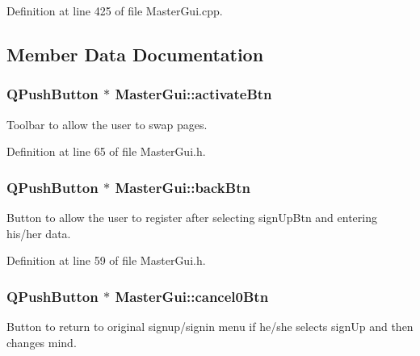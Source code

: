 Definition at line 425 of file Master\-Gui.\-cpp.



\subsection{Member Data Documentation}
\hypertarget{class_master_gui_a0916c489aa00b9e79a617ada5f2339b9}{
\subsubsection[{activate\-Btn}]{\setlength{\rightskip}{0pt plus 5cm}Q\-Push\-Button $\ast$ Master\-Gui\-::activate\-Btn\hspace{0.3cm}{\ttfamily [private]}}}\label{class_master_gui_a0916c489aa00b9e79a617ada5f2339b9}
Toolbar to allow the user to swap pages. 

Definition at line 65 of file Master\-Gui.\-h.

\hypertarget{class_master_gui_a4a80f25f8b78be209097d40c0d0f012b}{
\subsubsection[{back\-Btn}]{\setlength{\rightskip}{0pt plus 5cm}Q\-Push\-Button $\ast$ Master\-Gui\-::back\-Btn\hspace{0.3cm}{\ttfamily [private]}}}\label{class_master_gui_a4a80f25f8b78be209097d40c0d0f012b}
Button to allow the user to register after selecting sign\-Up\-Btn and entering his/her data. 

Definition at line 59 of file Master\-Gui.\-h.

\hypertarget{class_master_gui_a591bdee9c01349808ce30a1f1478b99f}{
\subsubsection[{cancel0\-Btn}]{\setlength{\rightskip}{0pt plus 5cm}Q\-Push\-Button $\ast$ Master\-Gui\-::cancel0\-Btn\hspace{0.3cm}{\ttfamily [private]}}}\label{class_master_gui_a591bdee9c01349808ce30a1f1478b99f}
Button to return to original signup/signin menu if he/she selects sign\-Up and then changes mind. 

